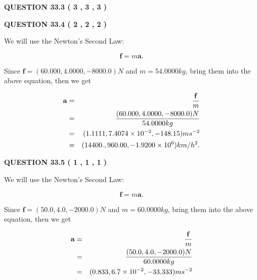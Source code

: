 \documentclass[12pt]{article}
\begin{document}
  
  
\vspace{0.2in}
  
{\textbf{\Large{QUESTION
33.3 
 (           3 ,           3 ,           3 )
}}}
  
  
  
\vspace{0.2in}
  
{\textbf{\Large{QUESTION
33.4 
 (           2 ,           2 ,           2 )
}}}
  
  
 
 

We will use the Newton's Second Law:
 
\[
\mathbf{f}=m\mathbf{a}.
\]
 
Since $\mathbf{f}=( %
60.000,  %
4.0000,  %
-8000.0 )N$
and $m= %
54.0000kg$, bring them into the above equation, then we get
 
\begin{eqnarray*}
\mathbf{a}&=&\frac{\mathbf{f}}m  \\
&=&\frac{(
60.000 ,
4.0000 ,
-8000.0 )N
}{ %
54.0000 kg}  \\
&=&(
1.1111 ,
7.4074 \times 10^{-2},
-148.15
)ms^{-2} \\
&=&(
14400. ,
960.00 ,
-1.9200 \times 10^{6}
)km/h^2.
\end{eqnarray*}
 
 
 
  
\vspace{0.2in}
  
{\textbf{\Large{QUESTION
33.5 
 (           1 ,           1 ,           1 )
}}}
  
  


 
 

We will use the Newton's Second Law:
 
\[
\mathbf{f}=m\mathbf{a}.
\]
 
Since $\mathbf{f}= %
(50.0 , 4.0 , -2000.0) N$
and $m= %
60.0000kg$, bring them into the above equation, then we get
 
\begin{eqnarray*}
\mathbf{a}&=&\frac{\mathbf{f}}m  \\
&=&\frac{ %
(50.0 , 4.0 , -2000.0) N}{ %
60.0000kg}  \\
&=& %
(0.833 , 6.7 \times 10^{-2} , -33.333) ms^{-2}
\end{eqnarray*}
 
 
 
  
\vspace{0.2in}
  
\end{document}
